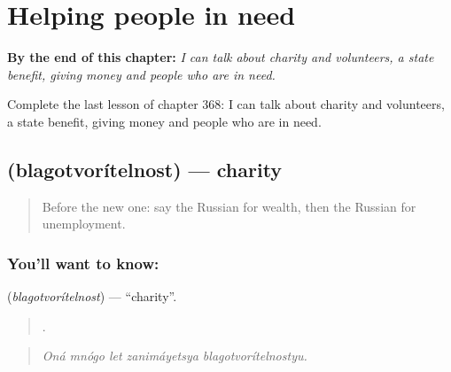 
\chapter{Helping people in need}
\label{ch:ru-helping-people-in-need}

\begin{chapteropening}
\textbf{By the end of this chapter:} \emph{I can talk about charity and volunteers, a state benefit, giving money and people who are in need.}

Complete the last lesson of chapter 368: I can talk about charity and volunteers, a state benefit, giving money and people who are in need.
\end{chapteropening}

\section[\texorpdfstring{\ru{благотворительность} (blagotvorítelnost)}{благотворительность (blagotvorítelnost)}]{ (blagotvorítelnost) — charity}

\label{lesson:RU-C368-blagotvoritelnost}



\begin{quote}
Before the new one: say the Russian for wealth, then the Russian for unemployment.
\end{quote}

\subsection*{You'll want to know: }
\textbf{} (\emph{blagotvorítelnost}) — \textquotedblleft{}charity\textquotedblright{}.

\begin{quote}
    .
\end{quote}

\begin{quote}
\emph{Oná mnógo let zanimáyetsya blagotvorítelnostyu.}
\end{quote}

